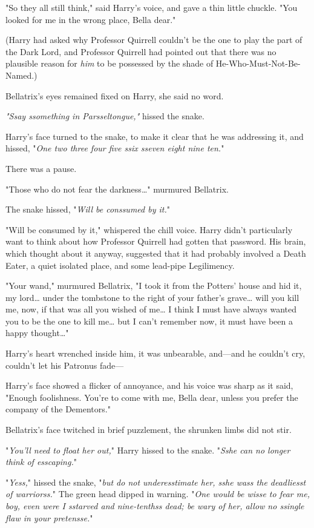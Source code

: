 "So they all still think," said Harry's voice, and gave a thin little chuckle. "You looked for me in the wrong place, Bella dear."

(Harry had asked why Professor Quirrell couldn't be the one to play the part of the Dark Lord, and Professor Quirrell had pointed out that there was no plausible reason for \emph{him} to be possessed by the shade of He-Who-Must-Not-Be-Named.)

Bellatrix's eyes remained fixed on Harry, she said no word.

\emph{"Ssay ssomething in Parsseltongue,"} hissed the snake.

Harry's face turned to the snake, to make it clear that he was addressing it, and hissed, "\emph{One two three four five ssix sseven eight nine ten.}"

There was a pause.

"Those who do not fear the darkness{\ldots}" murmured Bellatrix.

The snake hissed, "\emph{Will be conssumed by it.}"

"Will be consumed by it," whispered the chill voice. Harry didn't particularly want to think about how Professor Quirrell had gotten that password. His brain, which thought about it anyway, suggested that it had probably involved a Death Eater, a quiet isolated place, and some lead-pipe Legilimency.

"Your wand," murmured Bellatrix, "I took it from the Potters' house and hid it, my lord{\ldots} under the tombstone to the right of your father's grave{\ldots} will you kill me, now, if that was all you wished of me{\ldots} I think I must have always wanted you to be the one to kill me{\ldots} but I can't remember now, it must have been a happy thought{\ldots}"

Harry's heart wrenched inside him, it was unbearable, and---and he couldn't cry, couldn't let his Patronus fade---

Harry's face showed a flicker of annoyance, and his voice was sharp as it said, "Enough foolishness. You're to come with me, Bella dear, unless you prefer the company of the Dementors."

Bellatrix's face twitched in brief puzzlement, the shrunken limbs did not stir.

"\emph{You'll need to float her out,}" Harry hissed to the snake. "\emph{Sshe can no longer think of esscaping.}"

"\emph{Yess,}" hissed the snake, "\emph{but do not underesstimate her, sshe wass the deadliesst of warriorss.}" The green head dipped in warning. "\emph{One would be wisse to fear me, boy, even were I sstarved and nine-tenthss dead; be wary of her, allow no ssingle flaw in your pretensse.}"

